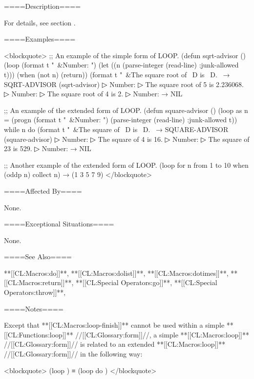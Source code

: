 ====Description====

For details, see section {\secref\LoopFacility}.

====Examples====

<blockquote> ;; An example of the simple form of LOOP. (defun sqrt-advisor () (loop (format t "~&Number: ") (let ((n (parse-integer (read-line) :junk-allowed t))) (when (not n) (return)) (format t "~&The square root of ~D is ~D.~ → SQRT-ADVISOR (sqrt-advisor)
▷ Number: \IN{5\CRLF}
▷ The square root of 5 is 2.236068.
▷ Number: \IN{4\CRLF}
▷ The square root of 4 is 2.
▷ Number:  → NIL

;; An example of the extended form of LOOP. (defun square-advisor () (loop as n = (progn (format t "~&Number: ") (parse-integer (read-line) :junk-allowed t)) while n do (format t "~&The square of ~D is ~D.~ → SQUARE-ADVISOR (square-advisor)
▷ Number: \IN{4\CRLF}
▷ The square of 4 is 16.
▷ Number: \IN{23\CRLF}
▷ The square of 23 is 529.
▷ Number:  → NIL

;; Another example of the extended form of LOOP. (loop for n from 1 to 10 when (oddp n) collect n) → (1 3 5 7 9) </blockquote>

====Affected By====

None.

====Exceptional Situations====

None.

====See Also====

**[[CL:Macros:do]]**, **[[CL:Macros:dolist]]**, **[[CL:Macros:dotimes]]**, **[[CL:Macros:return]]**, **[[CL:Special Operators:go]]**, **[[CL:Special Operators:throw]]**, {\secref\DestructuringLOOPVars}

====Notes====

Except that **[[CL:Macros:loop-finish]]** cannot be used within a simple **[[CL:Functions:loop]]** //[[CL:Glossary:form]]//, a simple **[[CL:Macros:loop]]** //[[CL:Glossary:form]]// is related to an extended **[[CL:Macros:loop]]** //[[CL:Glossary:form]]// in the following way:

<blockquote> (loop ) ≡ (loop do ) </blockquote>

 
